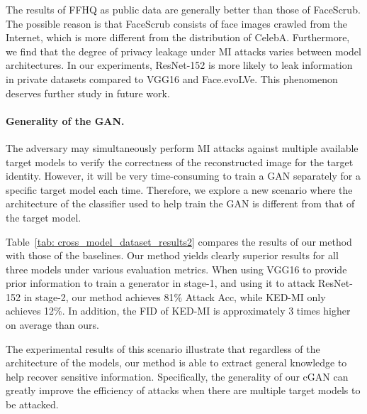 \documentclass[letterpaper]{article} %
\newcommand{\Tref}[1]{Table~\ref{#1}}
\begin{document}
The results of FFHQ as public data are generally better than those of FaceScrub. The possible reason is that FaceScrub consists of face images crawled from the Internet, which is more different from the distribution of CelebA. Furthermore, we find that the degree of privacy leakage under MI attacks varies between model architectures. In our experiments, ResNet-152 is more likely to leak information in private datasets compared to VGG16 and Face.evoLVe. This phenomenon deserves further study in future work.
    
\paragraph{Generality of the GAN.}
The adversary may simultaneously perform MI attacks against multiple available target models to verify the correctness of the reconstructed image for the target identity. However, it will be very time-consuming to train a GAN separately for a specific target model each time. Therefore, we explore a new scenario where the architecture of the classifier used to help train the GAN is different from that of the target model.

\Tref{tab: cross_model_dataset_results2} compares the results of our method with those of the baselines. Our method yields clearly superior results for all three models under various evaluation metrics. When using VGG16 to provide prior information to train a generator in stage-1, and using it to attack ResNet-152 in stage-2, our method achieves 81\% Attack Acc, while KED-MI only achieves 12\%. In addition, the FID of KED-MI is approximately 3 times higher on average than ours. 
    
The experimental results of this scenario illustrate that regardless of the architecture of the models, our method is able to extract general knowledge to help recover sensitive information. Specifically, the generality of our cGAN can greatly improve the efficiency of attacks when there are multiple target models to be attacked. 

    
\end{document}
